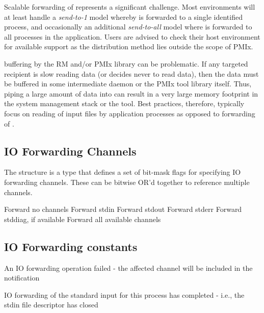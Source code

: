 \adviceuserstart
Scalable forwarding of  represents a significant challenge. Most environments will at least handle a \emph{send-to-1} model whereby  is forwarded to a single identified process, and occasionally an additional \emph{send-to-all} model where  is forwarded to all processes in the application. Users are advised to check their host environment for available support as the distribution method lies outside the scope of \ac{PMIx}.

 buffering by the \ac{RM} and/or \ac{PMIx} library can be problematic. If any targeted recipient is slow reading data (or decides never to read data), then the data must be buffered in some intermediate daemon or the \ac{PMIx} tool library itself. Thus, piping a large amount of data into  can result in a very large memory footprint in the system management stack or the tool. Best practices, therefore, typically focus on reading of input files by application processes as opposed to forwarding of .
\adviceuserend


\subsection{IO Forwarding Channels}

The  structure is a  type that defines a set of bit-mask flags for specifying IO forwarding channels. These can be bitwise OR'd together to reference multiple channels.

\begin{constantdesc}
%
Forward no channels
%
Forward stdin
%
Forward stdout
%
Forward stderr
%
Forward stddiag, if available
%
Forward all available channels
%
\end{constantdesc}


\subsection{IO Forwarding constants}

\begin{constantdesc}

%
An \ac{IO} forwarding operation failed - the affected channel will be included in the notification

%
\ac{IO} forwarding of the standard input for this process has completed - i.e., the stdin file descriptor has closed

\end{constantdesc}

